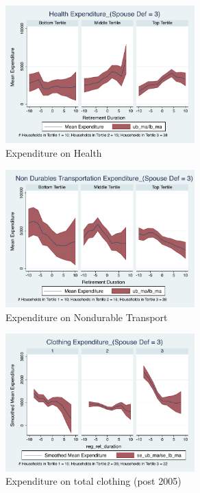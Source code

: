 \documentclass[11pt,onecolumn]{article}
\numberwithin{figure}{section}
\begin{document}
\begin{figure}[h]
	\caption{Expenditure on Health}
	\centering
	\includegraphics[width=0.65\textwidth]{../ConsumptionPostRetirement_by_SpouseDef_Cats/Smoothed/3/spouse_def_total_healthexpense_real.pdf}
\end{figure}


\begin{figure}[h]
	\caption{Expenditure on Nondurable Transport}
	\centering
	\includegraphics[width=0.65\textwidth]{../ConsumptionPostRetirement_by_SpouseDef_Cats/Smoothed/3/spouse_def_total_transport_real.pdf}
\end{figure}
\clearpage

\begin{figure}[h]
	\caption{Expenditure on total clothing (post 2005)}
	\centering
	\includegraphics[width=0.65\textwidth]{../ConsumptionPostRetirement_by_SpouseDef_Cats/Smoothed/3/spouse_def_total_clothing_2005_real.pdf}
\end{figure}
\end{document}
